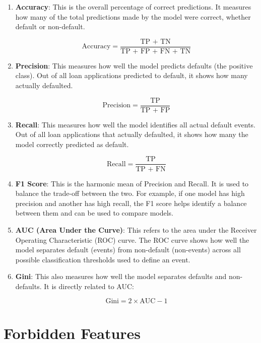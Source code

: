 \documentclass[
  letterpaper,
  DIV=11,
  numbers=noendperiod]{scrartcl}
\begin{document}
\begin{enumerate}
    \item \textbf{Accuracy}: This is the overall percentage of correct predictions. It measures how many of the total predictions made by the model were correct, whether default or non-default.

    $$
    \text{Accuracy} = \frac{\text{TP + TN}}{\text{TP + FP + FN + TN}}
    $$

   \item \textbf{Precision}: This measures how well the model predicts defaults (the positive class). Out of all loan applications predicted to default, it shows how many actually defaulted.

    $$
    \text{Precision} = \frac{\text{TP}}{\text{TP + FP}}
    $$

    \item \textbf{Recall}: This measures how well the model identifies all actual default events. Out of all loan applications that actually defaulted, it shows how many the model correctly predicted as default.

    $$
    \text{Recall} = \frac{\text{TP}}{\text{TP + FN}}
    $$

    \item \textbf{F1 Score}: This is the harmonic mean of Precision and Recall. It is used to balance the trade-off between the two. For example, if one model has high precision and another has high recall, the F1 score helps identify a balance between them and can be used to compare models.

    \item \textbf{AUC (Area Under the Curve)}: This refers to the area under the Receiver Operating Characteristic (ROC) curve. The ROC curve shows how well the model separates default (events) from non-default (non-events) across all possible classification thresholds used to define an event.

    \item \textbf{Gini}: This also measures how well the model separates defaults and non-defaults. It is directly related to AUC:

    $$
    \text{Gini} = 2 \times \text{AUC} - 1
    $$


\end{enumerate}

\section{Forbidden Features}
\end{document}
